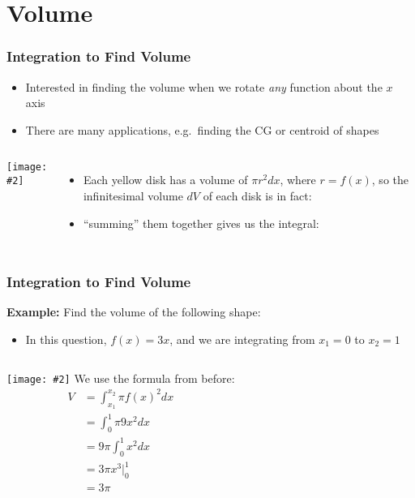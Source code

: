 \documentclass[12pt,compress,aspectratio=169]{beamer}
\newcommand{\pic}[2]{\texttt{[image: \#2]}}
\begin{document}
\section{Volume}

\begin{frame}
  \frametitle{Integration to Find Volume}
  \begin{itemize}
  \item Interested in finding the volume when we rotate \emph{any} function
    about the $x$ axis
  \item There are many applications, e.g.\ finding the CG or centroid of shapes
  \end{itemize}
  \begin{columns}
    \pic{1}{cone.png}
    \begin{itemize}
    \item Each yellow disk has a volume of $\pi r^2dx$,
      where $r=f(x)$, so the infinitesimal volume $dV$ of each disk is in fact:
      
    \item ``summing'' them together gives us the integral:
      
    \end{itemize}
  \end{columns}
\end{frame}



\begin{frame}
  \frametitle{Integration to Find Volume}
  \textbf{Example:} Find the volume of the following shape:
  \begin{itemize}
  \item In this question, $f(x)=3x$, and we are integrating from $x_1=0$ to
    $x_2=1$
  \end{itemize}
  \vspace{.1in}
  \begin{columns}
    \pic{1}{cone.png}
    We use the formula from before:
    \begin{align*}
      V&=\int_{x_1}^{x_2} \pi f(x)^{2} dx\\
      &=\int_{0}^{1} \pi 9x^2dx\\
      &=9\pi\int_{0}^{1} x^2dx\\
      &=3\pi x^3\Big|^1_0\\
      &=3\pi
    \end{align*}
  \end{columns}
\end{frame}
\end{document}
